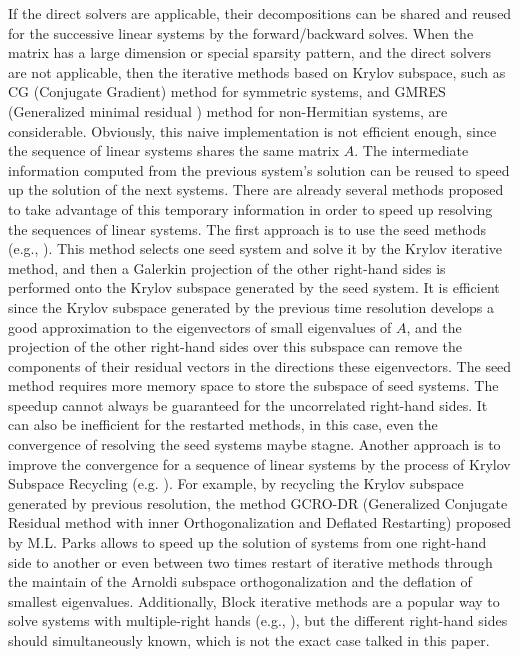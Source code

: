 If the direct solvers are applicable, their decompositions can be shared and reused for the successive linear systems by the forward/backward solves. When the matrix has a large dimension or special sparsity pattern, and the direct solvers are not applicable, then the iterative methods based on Krylov subspace, such as CG (Conjugate Gradient) method \cite{kershaw1978incomplete} for symmetric systems, and GMRES (Generalized minimal residual ) method \cite{saad1986gmres} for non-Hermitian systems, are considerable. Obviously, this naive implementation is not efficient enough, since the sequence of linear systems shares the same matrix $A$. The intermediate information computed from the previous system's solution can be reused to speed up the solution of the next systems. There are already several methods proposed to take advantage of this temporary information in order to speed up resolving the sequences of linear systems. The first approach is to use the seed methods (e.g., \cite{saad1987lanczos,papadrakakis1990new,smith1989conjugate,gu2002seed,simoncini1995iterative,abdel2014improved}). This method selects one seed system and solve it by the Krylov iterative method, and then a Galerkin projection of the other right-hand sides is performed onto the Krylov subspace generated by the seed system. It is efficient since the Krylov subspace generated by the previous time resolution develops a good approximation to the eigenvectors of small eigenvalues of $A$, and the projection of the other right-hand sides over this subspace can remove the components of their residual vectors in the directions these eigenvectors. The seed method requires more memory space to store the subspace of seed systems. The speedup cannot always be guaranteed for the uncorrelated right-hand sides.  It can also be inefficient for the restarted methods, in this case, even the convergence of resolving the seed systems maybe stagne. Another approach is to improve the convergence for a sequence of linear systems by the process of Krylov Subspace Recycling (e.g. \cite{parks2006recycling,jolivet2016block,kilmer2006recycling,ye2008generalized}). For example, by recycling the Krylov subspace generated by previous resolution, the method GCRO-DR (Generalized Conjugate Residual method with inner Orthogonalization
and Deflated Restarting) proposed by M.L. Parks \cite{parks2006recycling} allows to speed up the solution of systems from one right-hand side to another or even between two times restart of iterative methods through the maintain of the Arnoldi subspace orthogonalization and the deflation of smallest eigenvalues. Additionally, Block iterative methods are a popular way to solve systems with multiple-right hands (e.g., \cite{simoncini1995iterative,calvetti1994application, baker2006improving,gutknecht2006block}), but the different right-hand sides should simultaneously known, which is not the exact case talked in this paper. 

